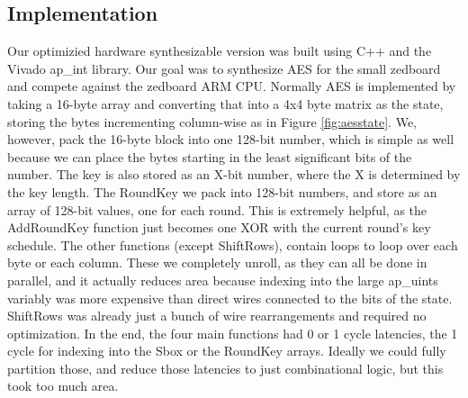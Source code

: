 \subsection{Implementation}
Our optimizied hardware synthesizable version was built using C++ and the Vivado ap\_int library. Our goal was to synthesize AES for the small zedboard and compete against the zedboard ARM CPU. Normally AES is implemented by taking a 16-byte array and converting that into a 4x4 byte matrix as the state, storing the bytes incrementing column-wise as in Figure \ref{fig:aesstate}. We, however, pack the 16-byte block into one 128-bit number, which is simple as well because we can place the bytes starting in the least significant bits of the number. The key is also stored as an X-bit number, where the X is determined by the key length. The RoundKey we pack into 128-bit numbers, and store as an array of 128-bit values, one for each round. This is extremely helpful, as the AddRoundKey function just becomes one XOR with the current round's key schedule. The other functions (except ShiftRows), contain loops to loop over each byte or each column. These we completely unroll, as they can all be done in parallel, and it actually reduces area because indexing into the large ap\_uints variably was more expensive than direct wires connected to the bits of the state. ShiftRows was already just a bunch of wire rearrangements and required no optimization. In the end, the four main functions had 0 or 1 cycle latencies, the 1 cycle for indexing into the Sbox or the RoundKey arrays. Ideally we could fully partition those, and reduce those latencies to just combinational logic, but this took too much area. 

